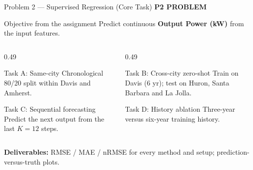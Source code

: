 \documentclass[aspectratio=169,11pt]{beamer}
\newcommand{\sectiontag}[1]{{\footnotesize\usebeamercolor[fg]{structure}\textbf{#1}}\par\vspace{0.10cm}}
\begin{document}
\begin{frame}{Problem 2 — Supervised Regression (Core Task)}
\sectiontag{P2 \quad PROBLEM}
\begin{block}{Objective from the assignment}
Predict continuous \textbf{Output Power (kW)} from the input features.
\end{block}
\vspace{0.01cm}
\begin{columns}[T,totalwidth=\textwidth]
\begin{column}{0.49\textwidth}
\begin{block}{Task A: Same-city}
\small Chronological 80/20 split within Davis and Amherst.
\end{block}
\begin{block}{Task C: Sequential forecasting}
\small Predict the next output from the last $K=12$ steps.
\end{block}
\end{column}
\begin{column}{0.49\textwidth}
\begin{block}{Task B: Cross-city zero-shot}
\small Train on Davis (6 yr); test on Huron, Santa Barbara and La Jolla.
\end{block}
\begin{block}{Task D: History ablation}
\small Three-year versus six-year training history.
\end{block}
\end{column}
\end{columns}
\vspace{0.03cm}
{\small\textbf{Deliverables:} RMSE / MAE / nRMSE for every method and setup; prediction-versus-truth plots.}
\end{frame}
\end{document}

